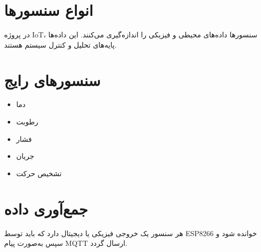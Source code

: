 \section{انواع سنسورها}

در پروژه IoT، سنسورها داده‌های محیطی و فیزیکی را اندازه‌گیری می‌کنند. این داده‌ها پایه‌های تحلیل و کنترل سیستم هستند.

\section{سنسورهای رایج}

\begin{itemize}
    \item دما
    \item رطوبت
    \item فشار
    \item جریان
    \item تشخیص حرکت
\end{itemize}

\section{جمع‌آوری داده}

هر سنسور یک خروجی فیزیکی یا دیجیتال دارد که باید توسط ESP8266 خوانده شود و سپس به‌صورت پیام MQTT ارسال گردد.
